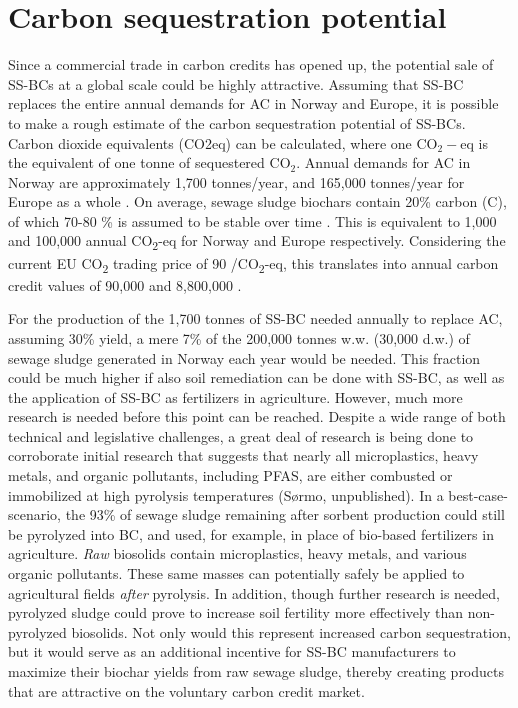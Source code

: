\section{Carbon sequestration potential}
Since a commercial trade in carbon credits has opened up, the potential sale of SS-BCs at a global scale could be highly attractive. Assuming that SS-BC replaces the entire annual demands for AC in Norway and Europe, it is possible to make a rough estimate of the carbon sequestration potential of SS-BCs. Carbon dioxide equivalents (\acrshort{CO2eq}) can be calculated, where one $\mathrm{CO_2-eq}$ is the equivalent of one tonne of sequestered $\mathrm{CO_2}$. Annual demands for AC in Norway are approximately 1,700 tonnes/year, and 165,000 tonnes/year for Europe as a whole \citep{schmidt2019pyrogenic}. On average, sewage sludge biochars contain 20\% carbon (C), of which 70-80 \% is assumed to be stable over time \citep{schmidt2019pyrogenic}. This is equivalent to 1,000 and 100,000 annual CO\textsubscript{2}-eq for Norway and Europe respectively. Considering the current EU CO\textsubscript{2} trading price of 90 \texteuro/CO\textsubscript{2}-eq, this translates into annual carbon credit values of 90,000 and 8,800,000 \texteuro. 

For the production of the 1,700 tonnes of SS-BC needed annually to replace AC, assuming 30\% yield, a mere 7\% of the 200,000 tonnes w.w. (30,000 d.w.) of sewage sludge generated in Norway each year would be needed. This fraction could be much higher if also soil remediation can be done with SS-BC, as well as the application of SS-BC as fertilizers in agriculture. However, much more research is needed before this point can be reached. Despite a wide range of both technical and legislative challenges, a great deal of research is being done to corroborate initial research that suggests that nearly all microplastics, heavy metals, and organic pollutants, including PFAS, are either combusted or immobilized at high pyrolysis temperatures (S\o rmo, unpublished). In a best-case-scenario, the 93\% of sewage sludge remaining after sorbent production could still be pyrolyzed into BC, and used, for example, in place of bio-based fertilizers in agriculture. \textit{Raw} biosolids contain microplastics, heavy metals, and various organic pollutants. These same masses can potentially safely be applied to agricultural fields \textit{after} pyrolysis. In addition, though further research is needed, pyrolyzed sludge could prove to increase soil fertility more effectively than non-pyrolyzed biosolids. Not only would this represent increased carbon sequestration, but it would serve as an additional incentive for SS-BC manufacturers to maximize their biochar yields from raw sewage sludge, thereby creating products that are attractive on the voluntary carbon credit market. 

